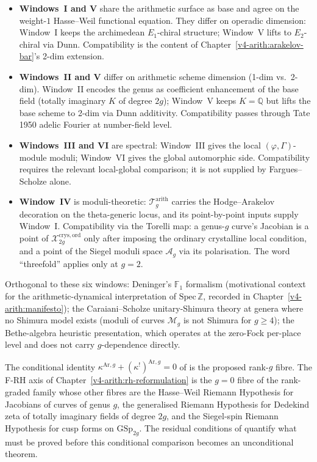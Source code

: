 \begin{itemize}
\item \textbf{Windows~I and V} share the arithmetic surface as base and
agree on the weight-\(1\) Hasse--Weil functional equation. They differ on
operadic dimension: Window~I keeps the archimedean \(E_1\)-chiral structure;
Window~V lifts to \(E_2\)-chiral via Dunn. Compatibility is the content of
Chapter~\ref{v4-arith:arakelov-bar}'s 2-dim extension.
\item \textbf{Windows~II and V} differ on arithmetic scheme dimension
(1-dim vs.\ 2-dim). Window~II encodes the genus as coefficient enhancement
of the base field (totally imaginary \(K\) of degree \(2g\)); Window~V keeps
\(K=\mathbb{Q}\) but lifts the base scheme to 2-dim via Dunn additivity.
Compatibility passes through Tate 1950 adelic Fourier at number-field level.
\item \textbf{Windows~III and VI} are spectral: Window~III gives the local
\((\varphi,\Gamma)\)-module moduli; Window~VI gives the global automorphic
side. Compatibility requires the relevant local-global comparison; it is
not supplied by Fargues--Scholze alone.
\item \textbf{Window~IV} is moduli-theoretic: \(\mathcal{T}_g^{\mathrm{arith}}\)
carries the Hodge--Arakelov decoration on the theta-generic locus, and
its point-by-point inputs supply Window~I. Compatibility via the Torelli
map: a genus-\(g\) curve's Jacobian is a point of
\(\mathcal{X}_{2g}^{\mathrm{crys,ord}}\) only after imposing the
ordinary crystalline local condition, and a point of the Siegel moduli
space \(\mathcal{A}_g\) via its polarisation. The word ``threefold''
applies only at \(g=2\).
\end{itemize}

Orthogonal to these six windows: Deninger's \(\mathbb{F}_1\) formalism
(motivational context for the arithmetic-dynamical interpretation of
\(\mathrm{Spec}\,\mathbb{Z}\), recorded in Chapter~\ref{v4-arith:manifesto});
the Caraiani--Scholze unitary-Shimura theory at genera where no
Shimura model exists (moduli of curves \(\mathcal{M}_g\) is not Shimura for
\(g\geq 4\)); the Bethe-algebra heuristic presentation, which operates at the
zero-Fock per-place level and does not carry \(g\)-dependence directly.

The conditional identity \(\kappa^{\mathrm{Ar},g}+(\kappa^{!})^{\mathrm{Ar},g}=0\)
of  is the proposed rank-\(g\) fibre. The
F-RH axis of Chapter~\ref{v4-arith:rh-reformulation} is the \(g=0\)
fibre of the rank-graded family whose other fibres are the Hasse--Weil
Riemann Hypothesis for Jacobians of curves of genus \(g\), the
generalised Riemann Hypothesis for Dedekind zeta of totally imaginary
fields of degree \(2g\), and the Siegel-spin Riemann Hypothesis for
cusp forms on \(\mathrm{GSp}_{2g}\). The residual conditions of
 quantify what must be proved before this
conditional comparison becomes an unconditional theorem.

